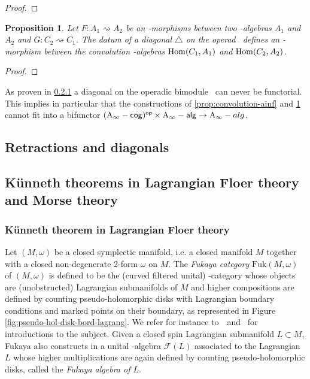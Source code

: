 \documentclass[twoside, 12pt]{amsart}
\newtheorem{proposition}[definition]{Proposition}
\theoremstyle{remark}
\begin{document}
\begin{proof} 
\end{proof}

\begin{proposition} \label{prop:convolution-minf}
Let $F : A_1 \rightsquigarrow A_2$ be an \Ainf -morphisms between two \Ainf -algebras $A_1$ and $A_2$ and $G : C_2 \rightsquigarrow C_1$. The datum of a diagonal $\triangle$ on the operad \Minf\ defines an \Ainf -morphism between the convolution \Ainf -algebras $\mathrm{Hom} (C_1,A_1)$ and $\mathrm{Hom} (C_2,A_2)$. 
\end{proposition}

\begin{proof}
\end{proof}

\noindent As proven in \ref{} a diagonal on the operadic bimodule \Minf\ can never be functorial. This implies in particular that the constructions of \cref{prop:convolution-ainf} and \cref{prop:convolution-minf} cannot fit into a bifunctor $\mathsf{(\mathrm{A}_\infty -cog)^{op}} \times \mathsf{\mathrm{A}_\infty -alg} \rightarrow \mathrm{A}_\infty -alg$. 

\subsection{Retractions and diagonals}


\subsection{ K\"unneth theorems in Lagrangian Floer theory and Morse theory}

\subsubsection{K\"unneth theorem in Lagrangian Floer theory}

Let $(M,\omega)$ be a closed symplectic manifold, i.e. a closed manifold $M$ together with a closed non-degenerate 2-form $\omega$ on $M$. 
The \emph{Fukaya category} $\mathrm{Fuk}(M,\omega)$ of $(M,\omega)$  is defined to be the (curved filtered unital) \Ainf -category whose objects are (unobstructed) Lagrangian submanifolds of $M$ and higher compositions are defined by counting pseudo-holomorphic disks with Lagrangian boundary conditions and marked points on their boundary, as represented in Figure \ref{fig:pseudo-hol-disk-bord-lagrang}. 
We refer for instance to~\cite{smith-prolegomenon}~and~\cite{auroux-fukaya} for introductions to the subject.
Given a closed spin Lagrangian submanifold $L \subset M$, Fukaya also constructs in \cite{fukaya-cyclic-symmetry} a unital \Ainf -algebra $\mathcal{F}(L)$ associated to the Lagrangian $L$ whose higher multiplications are again defined by counting pseudo-holomorphic disks, called the \emph{Fukaya algebra of $L$}. 
\end{document}
